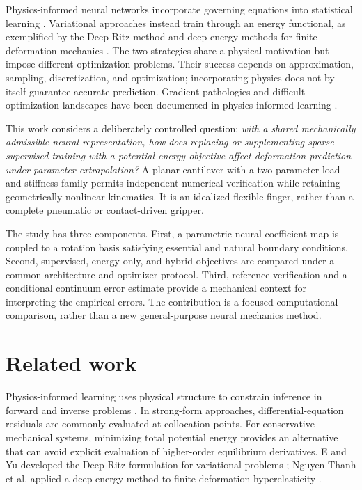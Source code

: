 \documentclass[11pt,a4paper]{article}
\begin{document}
Physics-informed neural networks incorporate governing equations into statistical learning \cite{raissi2019}. Variational approaches instead train through an energy functional, as exemplified by the Deep Ritz method \cite{e2018} and deep energy methods for finite-deformation mechanics \cite{nguyen2020}. The two strategies share a physical motivation but impose different optimization problems. Their success depends on approximation, sampling, discretization, and optimization; incorporating physics does not by itself guarantee accurate prediction. Gradient pathologies and difficult optimization landscapes have been documented in physics-informed learning \cite{wang2021,krishnapriyan2021}.

This work considers a deliberately controlled question: \emph{with a shared mechanically admissible neural representation, how does replacing or supplementing sparse supervised training with a potential-energy objective affect deformation prediction under parameter extrapolation?} A planar cantilever with a two-parameter load and stiffness family permits independent numerical verification while retaining geometrically nonlinear kinematics. It is an idealized flexible finger, rather than a complete pneumatic or contact-driven gripper.

The study has three components. First, a parametric neural coefficient map is coupled to a rotation basis satisfying essential and natural boundary conditions. Second, supervised, energy-only, and hybrid objectives are compared under a common architecture and optimizer protocol. Third, reference verification and a conditional continuum error estimate provide a mechanical context for interpreting the empirical errors. The contribution is a focused computational comparison, rather than a new general-purpose neural mechanics method.

\section{Related work}
Physics-informed learning uses physical structure to constrain inference in forward and inverse problems \cite{raissi2019,karniadakis2021}. In strong-form approaches, differential-equation residuals are commonly evaluated at collocation points. For conservative mechanical systems, minimizing total potential energy provides an alternative that can avoid explicit evaluation of higher-order equilibrium derivatives. E and Yu developed the Deep Ritz formulation for variational problems \cite{e2018}; Nguyen-Thanh et al. applied a deep energy method to finite-deformation hyperelasticity \cite{nguyen2020}.
\end{document}

